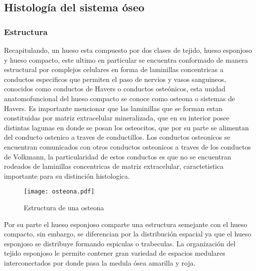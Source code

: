 \documentclass[letterpaper,12pt,oneside]{book}
\begin{document}
    \subsection{Histología del sistema óseo}

    \subsubsection{Estructura}



    Recapitulando, un hueso esta compuesto por dos clases de tejido, hueso esponjoso y hueso compacto, este ultimo en particular se encuentra conformado de manera estructural por complejos celulares en forma de laminillas concentricas a conductos especificos que permiten el paso de nervios y vasos sanguineos, conocidos como conductos de Havers o conductos osteónicos, esta unidad anatomofuncional del hueso compacto se conoce como osteona o sistemas de Havers. Es importante mencionar que las laminillas que se forman estan constituidas por matriz extracelular mineralizada, que en su interior posee distintas lagunas en donde se posan los osteocitos, que por su parte se alimentan del conducto ostenico a traves de conductillos. Los conductos osteonicos se encuentran comunicados con otros conductos osteonicos a traves de los conductos de Volkmann, la particularidad de estos conductos es que no se encuentran rodeados de laminillas concentricas de matriz extracelular, caractetistica importante para su distinción histologica. 

    \vspace{10pt}

    \begin{figure}[h!]
        \centering
        \texttt{[image: osteona.pdf]}
        \caption{Estructura de una osteona}
        \label{im2}
    \end{figure}

    \vspace{10pt}

    Por su parte el hueso esponjoso comparte una estructura semejante con el hueso compacto, sin embargo, se diferencian por la distribución espacial ya que el hueso esponjoso se distribuye formando espiculas o trabeculas. La organización del tejido esponjoso le permite contener gran variedad de espacios medulares interconectados por donde pasa la medula ósea amarilla y roja. 

    \vspace{10pt}
\end{document}
